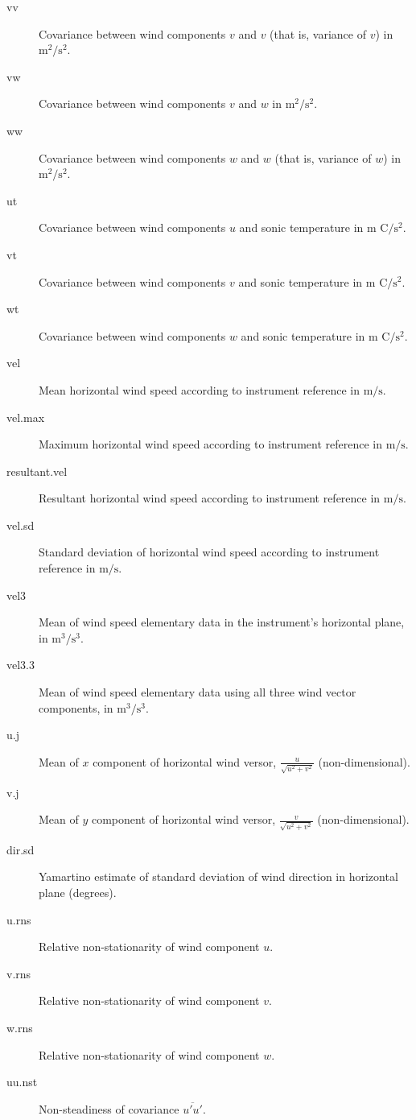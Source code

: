 \documentclass[a4paper,10pt]{book}
\begin{document}
\begin{description}
 \item[vv] Covariance between wind components $v$ and $v$ (that is, variance of $v$) in $\mbox{m}^2/\mbox{s}^2$.
 \item[vw] Covariance between wind components $v$ and $w$ in $\mbox{m}^2/\mbox{s}^2$.
 \item[ww] Covariance between wind components $w$ and $w$ (that is, variance of $w$) in $\mbox{m}^2/\mbox{s}^2$.
 \item[ut] Covariance between wind components $u$ and sonic temperature in $\mbox{m C}/\mbox{s}^2$.
 \item[vt] Covariance between wind components $v$ and sonic temperature in $\mbox{m C}/\mbox{s}^2$.
 \item[wt] Covariance between wind components $w$ and sonic temperature in $\mbox{m C}/\mbox{s}^2$.
 \item[vel] Mean horizontal wind speed according to instrument reference in $\mbox{m}/\mbox{s}$.
 \item[vel.max] Maximum horizontal wind speed according to instrument reference in $\mbox{m}/\mbox{s}$.
 \item[resultant.vel] Resultant horizontal wind speed according to instrument reference in $\mbox{m}/\mbox{s}$.
 \item[vel.sd] Standard deviation of horizontal wind speed according to instrument reference in $\mbox{m}/\mbox{s}$.
 \item[vel3] Mean of wind speed elementary data in the instrument's horizontal plane, in $\mbox{m}^{3}/\mbox{s}^{3}$.
 \item[vel3.3] Mean of wind speed elementary data using all three wind vector components, in $\mbox{m}^{3}/\mbox{s}^{3}$.
 \item[u.j] Mean of $x$ component of horizontal wind versor, $\frac{u}{\sqrt{u^2+v^2}}$ (non-dimensional).
 \item[v.j] Mean of $y$ component of horizontal wind versor, $\frac{v}{\sqrt{u^2+v^2}}$ (non-dimensional).
 \item[dir.sd] Yamartino estimate of standard deviation of wind direction in horizontal plane (degrees).
 \item[u.rns] Relative non-stationarity of wind component $u$.
 \item[v.rns] Relative non-stationarity of wind component $v$.
 \item[w.rns] Relative non-stationarity of wind component $w$.
 \item[uu.nst] Non-steadiness of covariance $\overline{u'u'}$.

\end{description}
\end{document}
